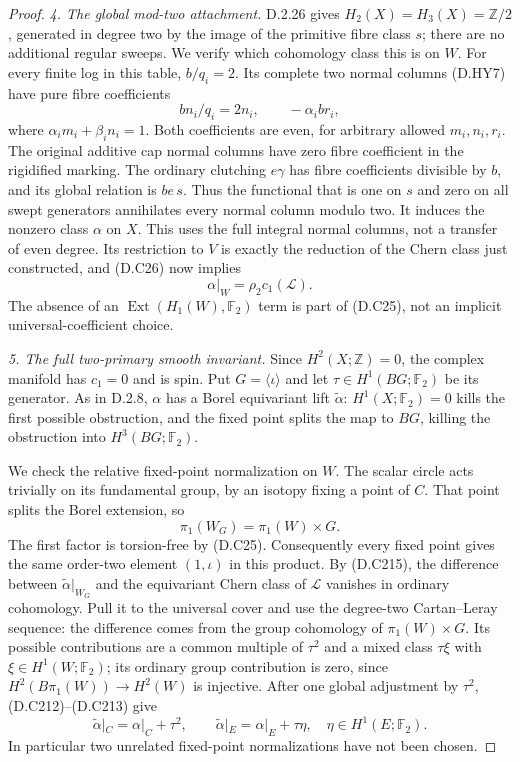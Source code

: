\begin{proof}
\emph{4. The global mod-two attachment.}
D.2.26 gives $H_2(X)=H_3(X)=\mathbb Z/2$, generated in degree two by
the image of the primitive fibre class $s$; there are no additional
regular sweeps. We verify which cohomology class this is on $W$.
For every finite log in this table, $b/q_i=2$. Its complete two normal
columns (D.HY7) have pure fibre coefficients
\[
                 bn_i/q_i=2n_i,
                \qquad -\alpha_i b r_i,                       \tag{D.C214}
\]
where $\alpha_i m_i+\beta_i n_i=1$. Both coefficients are even,
for arbitrary allowed $m_i,n_i,r_i$. The original additive cap normal
columns have zero fibre coefficient in the rigidified marking.
The ordinary clutching $e\gamma$ has fibre coefficients divisible by
$b$, and its global relation is $be\,s$. Thus the functional that is
one on $s$ and zero on all swept generators annihilates every normal
column modulo two. It induces the nonzero class $\alpha$ on $X$.
This uses the full integral normal columns, not a transfer of even
degree. Its restriction to $V$ is exactly the reduction of the Chern
class just constructed, and (D.C26) now implies
\[
                  \alpha|_W=\rho_2c_1(\mathcal L).             \tag{D.C215}
\]
The absence of an $\operatorname{Ext}(H_1(W),\mathbb F_2)$ term is
part of (D.C25), not an implicit universal-coefficient choice.

\emph{5. The full two-primary smooth invariant.}
Since $H^2(X;\mathbb Z)=0$, the complex manifold has $c_1=0$ and is
spin. Put $G=\langle\iota\rangle$ and let
$\tau\in H^1(BG;\mathbb F_2)$ be its generator. As in D.2.8,
$\alpha$ has a Borel equivariant lift $\widetilde\alpha$:
$H^1(X;\mathbb F_2)=0$ kills the first possible obstruction, and the
fixed point splits the map to $BG$, killing the obstruction into
$H^3(BG;\mathbb F_2)$.

We check the relative fixed-point normalization on $W$. The scalar
circle acts trivially on its fundamental group, by an isotopy fixing
a point of $C$. That point splits the Borel extension, so
\[
                 \pi_1(W_G)=\pi_1(W)\times G.
\]
The first factor is torsion-free by (D.C25). Consequently every fixed
point gives the same order-two element $(1,\iota)$ in this product.
By (D.C215), the difference between $\widetilde\alpha|_{W_G}$ and
the equivariant Chern class of $\mathcal L$ vanishes in ordinary
cohomology. Pull it to the universal cover and use the degree-two
Cartan--Leray sequence: the difference comes from the group cohomology
of $\pi_1(W)\times G$. Its possible contributions are a common
multiple of $\tau^2$ and a mixed class $\tau\xi$ with
$\xi\in H^1(W;\mathbb F_2)$; its ordinary group contribution is
zero, since $H^2(B\pi_1(W))\to H^2(W)$ is injective. After one global
adjustment by $\tau^2$, (D.C212)--(D.C213) give
\[
 \widetilde\alpha|_C=\alpha|_C+\tau^2,
 \qquad \widetilde\alpha|_E=\alpha|_E+\tau\eta,
       \quad\eta\in H^1(E;\mathbb F_2).                       \tag{D.C216}
\]
In particular two unrelated fixed-point normalizations have not been
chosen.


\end{proof}
